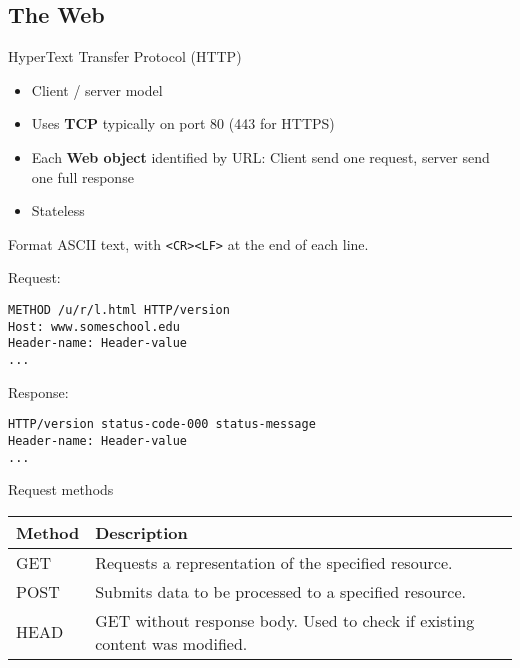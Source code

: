 \subsection{The Web}

\begin{definition}
    {HyperText Transfer Protocol (HTTP)}

    \begin{itemize}
        \item Client / server model
        \item Uses \textbf{TCP} typically on port 80 (443 for HTTPS)
        \item Each \textbf{Web object} identified by URL: Client send one request, server send one full response
        \item Stateless
    \end{itemize}
\end{definition}

\begin{knBox}
    {Format}
    ASCII text, with \texttt{<CR><LF>} at the end of each line.

    Request:

    \begin{lstlisting}[]
METHOD /u/r/l.html HTTP/version
Host: www.someschool.edu
Header-name: Header-value
...\end{lstlisting}

    Response:

    \begin{lstlisting}[]
HTTP/version status-code-000 status-message
Header-name: Header-value
...\end{lstlisting}

\end{knBox}

\begin{definition}
    {Request methods}
    \begin{tabular}{|l|l|}
        \hline
        \textbf{Method} & \textbf{Description}                                                        \\
        \hline
        GET             & Requests a representation of the specified resource.                        \\
        \hline
        POST            & Submits data to be processed to a specified resource.                       \\
        \hline
        HEAD            & GET without response body.  Used to check if existing content was modified. \\
        \hline
    \end{tabular}
\end{definition}

